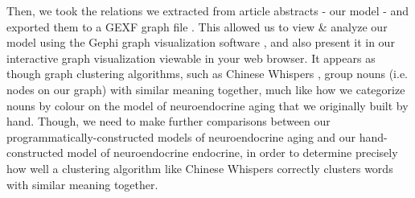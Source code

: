 Then, we took the relations we extracted from article abstracts - our model - and exported them to a GEXF graph file \cite{thegexfworkinggroup2009}.
This allowed us to view \& analyze our model using the Gephi graph visualization software
\cite{conf/icwsm/BastianHJ09}, and also present it in our interactive graph
visualization viewable in your web browser. It appears as though graph clustering algorithms, such as Chinese Whispers \cite{Biemann:2006:CWE:1654758.1654774}
, group nouns (i.e. nodes on our graph) with similar meaning together, much like how we categorize nouns by colour on the model of neuroendocrine
aging that we originally built by hand. Though, we need to make further comparisons between our programmatically-constructed
models of neuroendocrine aging and our hand-constructed model of neuroendocrine endocrine, in order to determine precisely how well a
clustering algorithm like Chinese Whispers correctly clusters words with similar meaning together.
